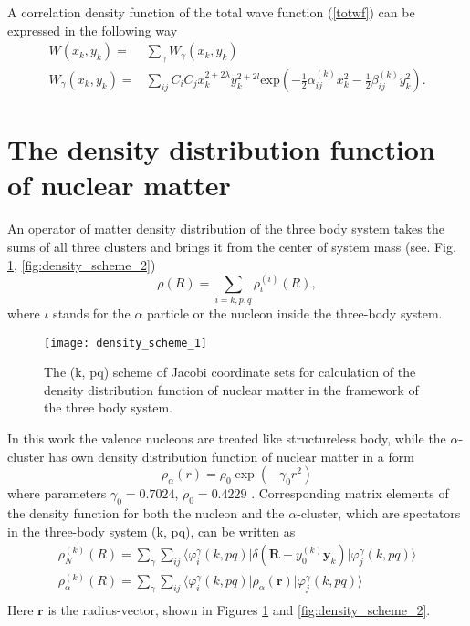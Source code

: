 \documentclass[
12pt, %
oneside, %
english, %
onehalfspacing, %
onehalfspacing, %
headsepline, %
]{MastersDoctoralThesis} %
\begin{document}
A correlation density function of the total wave function (\ref{totwf})  can be expressed in the following way
\begin{align}
W\left( x_k,y_k \right) =& \sum_{\gamma} W_{\gamma}\left( x_k,y_k \right) \nonumber \\
W_{\gamma}\left( x_k,y_k \right) =& \sum_{ij} C_i C_j x^{2+2\lambda}_k y^{2+2l}_k \text{exp}\left( - \tfrac{1}{2} \alpha^{(k)}_{ij} x_k^2 -  \tfrac{1}{2} \beta^{(k)}_{ij} y_k^2 \right) .
\end{align}

\section{The density distribution function of nuclear matter}
\label{section_density_function}

An operator of matter density distribution of the three body system takes the sums of all three clusters and brings it from the center of  system mass (see. Fig. \ref{fig:density_scheme_1}, \ref{fig:density_scheme_2})
\begin{equation}
\rho({R})=\sum_{\scriptscriptstyle{i}=k,p,q} \rho^{(i)}_{{\iota}}({R}),
\label{total_density}
\end{equation}
where $\iota$ stands for the $\alpha$ particle or the nucleon inside the three-body system.

\begin{figure}[b]
\centering
\texttt{[image: density\_scheme\_1]}
\decoRule
\caption{\footnotesize The (k, pq) scheme of Jacobi coordinate sets for calculation of the density distribution function of nuclear matter in the framework of  the three body system.}
\label{fig:density_scheme_1}
\end{figure}

In this work 
the valence nucleons are treated like structureless body, 
while the $\alpha$-cluster has own density distribution function of nuclear matter in a form
\begin{equation}
\rho_\alpha(r)=\rho_0 \exp\left(-\gamma_0 r^2 \right)
\label{alpha_density}
\end{equation}
 where parameters $ \gamma_0= 0.7024$, $  \displaystyle \rho_0=0.4229$ \cite{satchler1979folding}. Corresponding matrix elements of the density function for both the nucleon and the $\alpha$-cluster, which are spectators in the three-body system (k, pq), can be written as 
\begin{equation}
\label{densities}
\begin{gathered}
\rho_{N}^{(k)}({R})=
\sum_{\gamma}
\sum_{ij}
\langle\varphi^{{\gamma}}_i(k, pq) 
\vert \delta(\textbf{R}-y_0^{(k)}\textbf{y}_k)
\vert \varphi^{{\gamma}}_j(k, pq)\rangle \\
\rho_{\alpha}^{(k)}({R})= 
\sum_{\gamma}
\sum_{ij}
\langle\varphi^{{\gamma}}_i(k, pq) 
\vert \rho_{\alpha}(\textbf{r}) 
\vert \varphi^{{\gamma}}_j(k, pq)\rangle \\
\end{gathered}
\end{equation}
Here $\textbf{r}$ is the radius-vector, shown in Figures \ref{fig:density_scheme_1} and \ref{fig:density_scheme_2}.
\end{document}
